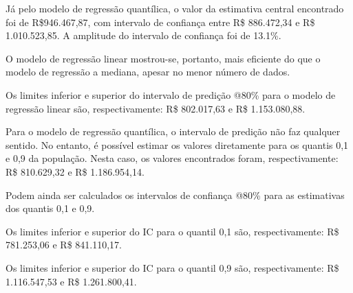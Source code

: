 \documentclass[a4paper, 12pt]{article}
\begin{document}
Já pelo modelo de regressão quantílica, o valor da estimativa central
encontrado foi de R\$946.467,87, com intervalo de confiança entre R\$
886.472,34 e R\$ 1.010.523,85. A amplitude do intervalo de confiança foi
de 13.1\%.

O modelo de regressão linear mostrou-se, portanto, mais eficiente do que
o modelo de regressão a mediana, apesar no menor número de dados.

Os limites inferior e superior do intervalo de predição @80\% para o
modelo de regressão linear são, respectivamente: R\$ 802.017,63 e R\$
1.153.080,88.

Para o modelo de regressão quantílica, o intervalo de predição não faz
qualquer sentido. No entanto, é possível estimar os valores diretamente
para os quantis 0,1 e 0,9 da população. Nesta caso, os valores
encontrados foram, respectivamente: R\$ 810.629,32 e R\$ 1.186.954,14.

Podem ainda ser calculados os intervalos de confiança @80\% para as
estimativas dos quantis 0,1 e 0,9.

Os limites inferior e superior do IC para o quantil 0,1 são,
respectivamente: R\$ 781.253,06 e R\$ 841.110,17.

Os limites inferior e superior do IC para o quantil 0,9 são,
respectivamente: R\$ 1.116.547,53 e R\$ 1.261.800,41.

\printbibliography[title=Referências]
\end{document}
